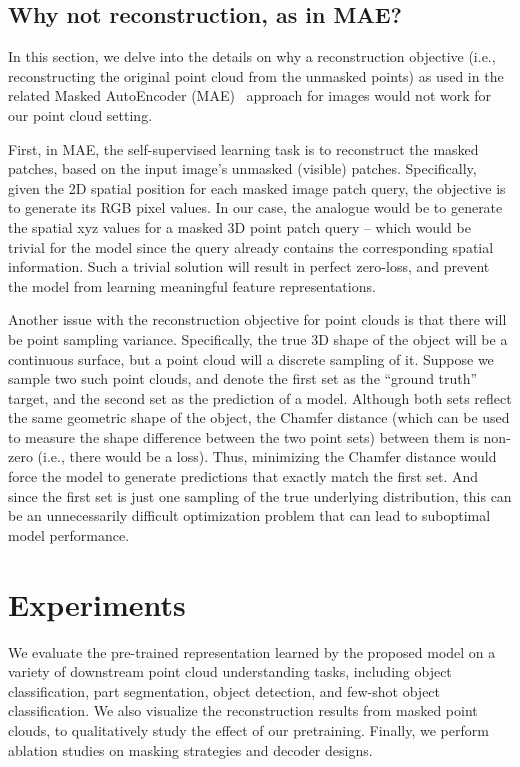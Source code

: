 \documentclass[runningheads]{llncs}
\begin{document}
\subsection{Why not reconstruction, as in MAE?}
\label{sec:why_not}

In this section, we delve into the details on why a reconstruction objective (i.e., reconstructing the original point cloud from the unmasked points) as used in the related Masked AutoEncoder (MAE)~\cite{mae} approach for images would not work for our point cloud setting.  

First, in MAE, the self-supervised learning task is to reconstruct the masked patches, based on the input image's unmasked (visible) patches.  Specifically, given the 2D spatial position for each masked image patch query, the objective is to generate its RGB pixel values. In our case, the analogue would be to generate the spatial xyz values for a masked 3D point patch query -- which would be trivial for the model since the query already contains the corresponding spatial information.  Such a trivial solution will result in perfect zero-loss, and prevent the model from learning meaningful feature representations.

Another issue with the reconstruction objective for point clouds is that there will be point sampling variance. Specifically, the true 3D shape of the object will be a continuous surface, but a point cloud will a discrete sampling of it.  Suppose we sample two such point clouds, and denote the first set as the ``ground truth'' target, and the second set as the prediction of a model.  Although both sets reflect the same geometric shape of the object, the Chamfer distance (which can be used to measure the shape difference between the two point sets) between them is non-zero (i.e., there would be a loss).  Thus, minimizing the Chamfer distance would force the model to generate predictions that exactly match the first set.  And since the first set is just one sampling of the true underlying distribution, this can be an unnecessarily difficult optimization problem that can lead to suboptimal model performance. 
 \section{Experiments}

We evaluate the pre-trained representation learned by the proposed model on a variety of downstream point cloud understanding tasks, including object classification, part segmentation, object detection, and few-shot object classification.  We also visualize the reconstruction results from masked point clouds, to qualitatively study the effect of our pretraining.  Finally, we perform ablation studies on masking strategies and decoder designs.
\end{document}
